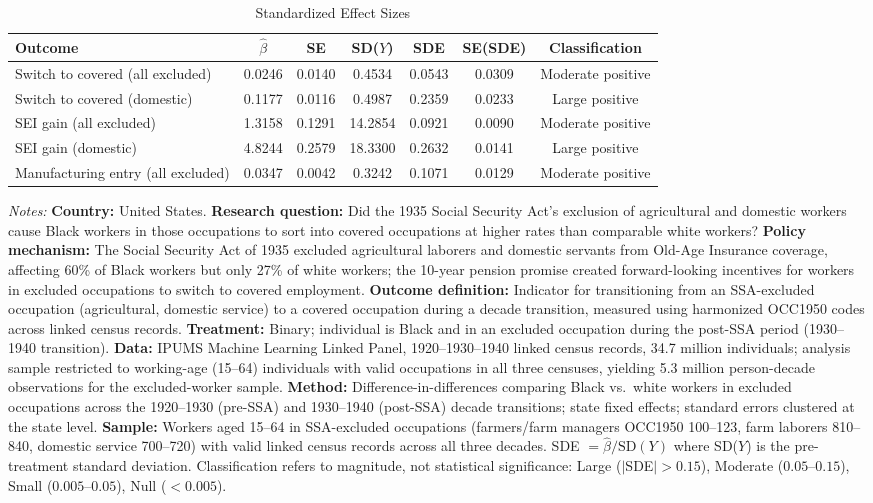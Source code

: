 \begin{table}[t]
\centering
\caption{Standardized Effect Sizes}
\label{tab:sde}
\begin{adjustbox}{max width=\textwidth}
\begin{tabular}{lcccccc}
\hline\hline
Outcome & $\hat{\beta}$ & SE & SD($Y$) & SDE & SE(SDE) & Classification \\
\hline
Switch to covered (all excluded) & 0.0246 & 0.0140 & 0.4534 & 0.0543 & 0.0309 & Moderate positive \\
Switch to covered (domestic) & 0.1177 & 0.0116 & 0.4987 & 0.2359 & 0.0233 & Large positive \\
SEI gain (all excluded) & 1.3158 & 0.1291 & 14.2854 & 0.0921 & 0.0090 & Moderate positive \\
SEI gain (domestic) & 4.8244 & 0.2579 & 18.3300 & 0.2632 & 0.0141 & Large positive \\
Manufacturing entry (all excluded) & 0.0347 & 0.0042 & 0.3242 & 0.1071 & 0.0129 & Moderate positive \\
\hline\hline
\end{tabular}
\end{adjustbox}
\begin{tablenotes}
\small
\item \textit{Notes:} \textbf{Country:} United States. \textbf{Research question:} Did the 1935 Social Security Act's exclusion of agricultural and domestic workers cause Black workers in those occupations to sort into covered occupations at higher rates than comparable white workers? \textbf{Policy mechanism:} The Social Security Act of 1935 excluded agricultural laborers and domestic servants from Old-Age Insurance coverage, affecting 60\% of Black workers but only 27\% of white workers; the 10-year pension promise created forward-looking incentives for workers in excluded occupations to switch to covered employment. \textbf{Outcome definition:} Indicator for transitioning from an SSA-excluded occupation (agricultural, domestic service) to a covered occupation during a decade transition, measured using harmonized OCC1950 codes across linked census records. \textbf{Treatment:} Binary; individual is Black and in an excluded occupation during the post-SSA period (1930--1940 transition). \textbf{Data:} IPUMS Machine Learning Linked Panel, 1920--1930--1940 linked census records, 34.7 million individuals; analysis sample restricted to working-age (15--64) individuals with valid occupations in all three censuses, yielding 5.3 million person-decade observations for the excluded-worker sample. \textbf{Method:} Difference-in-differences comparing Black vs.\ white workers in excluded occupations across the 1920--1930 (pre-SSA) and 1930--1940 (post-SSA) decade transitions; state fixed effects; standard errors clustered at the state level. \textbf{Sample:} Workers aged 15--64 in SSA-excluded occupations (farmers/farm managers OCC1950 100--123, farm laborers 810--840, domestic service 700--720) with valid linked census records across all three decades. SDE $= \hat{\beta} / \text{SD}(Y)$ where SD($Y$) is the pre-treatment standard deviation. Classification refers to magnitude, not statistical significance: Large ($|$SDE$| > 0.15$), Moderate ($0.05$--$0.15$), Small ($0.005$--$0.05$), Null ($< 0.005$).

\end{tablenotes}
\end{table}
